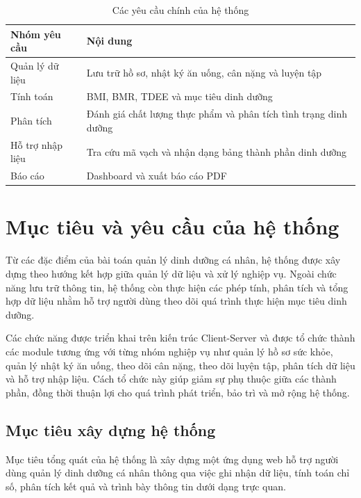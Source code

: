 \documentclass[12pt, a4paper]{report}
\begin{document}
\begin{table}[htbp]
    \centering
    \caption{Các yêu cầu chính của hệ thống}
    \label{tab:yeu_cau_he_thong}
    \vspace{4pt}
    \renewcommand{\arraystretch}{1.3}
    \begin{tabular}{|>{\raggedright\arraybackslash}p{4cm}|p{11cm}|}
        \hline
        \textbf{Nhóm yêu cầu} & \textbf{Nội dung} \\
        \hline
        Quản lý dữ liệu & Lưu trữ hồ sơ, nhật ký ăn uống, cân nặng và luyện tập \\
        \hline
        Tính toán & BMI, BMR, TDEE và mục tiêu dinh dưỡng \\
        \hline
        Phân tích & Đánh giá chất lượng thực phẩm và phân tích tình trạng dinh dưỡng \\
        \hline
        Hỗ trợ nhập liệu & Tra cứu mã vạch và nhận dạng bảng thành phần dinh dưỡng \\
        \hline
        Báo cáo & Dashboard và xuất báo cáo PDF \\
        \hline
    \end{tabular}
\end{table}
\section{Mục tiêu và yêu cầu của hệ thống}
Từ các đặc điểm của bài toán quản lý dinh dưỡng cá nhân, hệ thống được xây dựng theo hướng kết hợp giữa quản lý dữ liệu và xử lý nghiệp vụ. Ngoài chức năng lưu trữ thông tin, hệ thống còn thực hiện các phép tính, phân tích và tổng hợp dữ liệu nhằm hỗ trợ người dùng theo dõi quá trình thực hiện mục tiêu dinh dưỡng.

Các chức năng được triển khai trên kiến trúc Client-Server và được tổ chức thành các module tương ứng với từng nhóm nghiệp vụ như quản lý hồ sơ sức khỏe, quản lý nhật ký ăn uống, theo dõi cân nặng, theo dõi luyện tập, phân tích dữ liệu và hỗ trợ nhập liệu. Cách tổ chức này giúp giảm sự phụ thuộc giữa các thành phần, đồng thời thuận lợi cho quá trình phát triển, bảo trì và mở rộng hệ thống.

\subsection{Mục tiêu xây dựng hệ thống}
Mục tiêu tổng quát của hệ thống là xây dựng một ứng dụng web hỗ trợ người dùng quản lý dinh dưỡng cá nhân thông qua việc ghi nhận dữ liệu, tính toán chỉ số, phân tích kết quả và trình bày thông tin dưới dạng trực quan.
\end{document}
